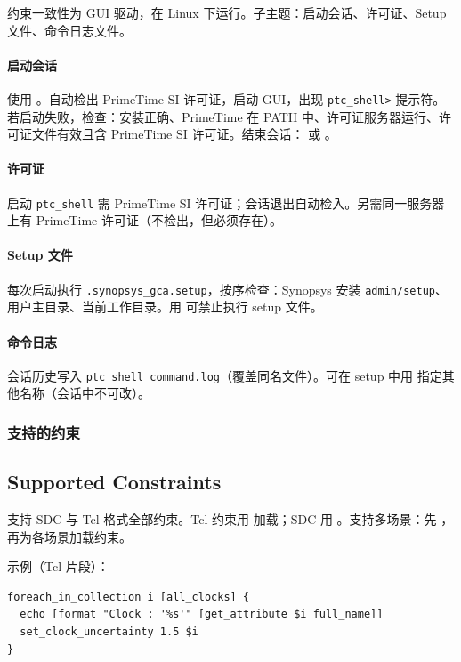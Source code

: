 约束一致性为 GUI 驱动，在 Linux 下运行。子主题：启动会话、许可证、Setup 文件、命令日志文件。

\paragraph{启动会话} 使用 。自动检出 PrimeTime SI 许可证，启动 GUI，出现 \texttt{ptc\_shell>} 提示符。若启动失败，检查：安装正确、PrimeTime 在 PATH 中、许可证服务器运行、许可证文件有效且含 PrimeTime SI 许可证。结束会话： 或 。

\paragraph{许可证} 启动 \texttt{ptc\_shell} 需 PrimeTime SI 许可证；会话退出自动检入。另需同一服务器上有 PrimeTime 许可证（不检出，但必须存在）。

\paragraph{Setup 文件} 每次启动执行 \texttt{.synopsys\_gca.setup}，按序检查：Synopsys 安装 \texttt{admin/setup}、用户主目录、当前工作目录。用  可禁止执行 setup 文件。

\paragraph{命令日志} 会话历史写入 \texttt{ptc\_shell\_command.log}（覆盖同名文件）。可在 setup 中用  指定其他名称（会话中不可改）。

\subsubsection{支持的约束}
\subsection*{Supported Constraints}

支持 SDC 与 Tcl 格式全部约束。Tcl 约束用  加载；SDC 用 。支持多场景：先 ，再为各场景加载约束。

示例（Tcl 片段）：
\begin{lstlisting}
foreach_in_collection i [all_clocks] {
  echo [format "Clock : '%s'" [get_attribute $i full_name]]
  set_clock_uncertainty 1.5 $i
}
\end{lstlisting}

